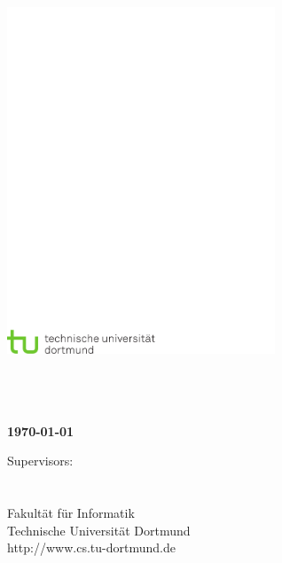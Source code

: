 \thispagestyle{empty}
\begin{titlepage}
\vspace*{-2cm}
\newlength{\links}
\setlength{\links}{-0.5cm} \sffamily \LARGE



\hspace*{\links}
\begin{minipage}{12.5cm}
\includegraphics[width=8cm]{coverpage/tud_logo_cmyk}
\end{minipage}

\vspace*{4cm}

\hspace*{\links}
\hspace*{-0.2cm}
\begin{minipage}{9cm}
\large
\begin{center}
\bfseries{\Titel} \\
\vspace*{1cm}
{\small \Untertitel} \\
\vspace*{1.5cm}
\Autor\\
\today
\end{center}
\end{minipage}



\vfill

\hspace*{\links}
\begin{minipage}[b]{15cm}
\normalsize
\raggedright
%
\vspace*{2.5cm}
%
\normalsize \raggedright
Supervisors: \\
\Supervisor \\
\otherSupervisor \\ 
\vspace*{1.5cm}
\textcolor{TUGreen}{Fakultät für Informatik\\
Technische Universität Dortmund \\
http://www.cs.tu-dortmund.de}
\end{minipage}


\end{titlepage}
